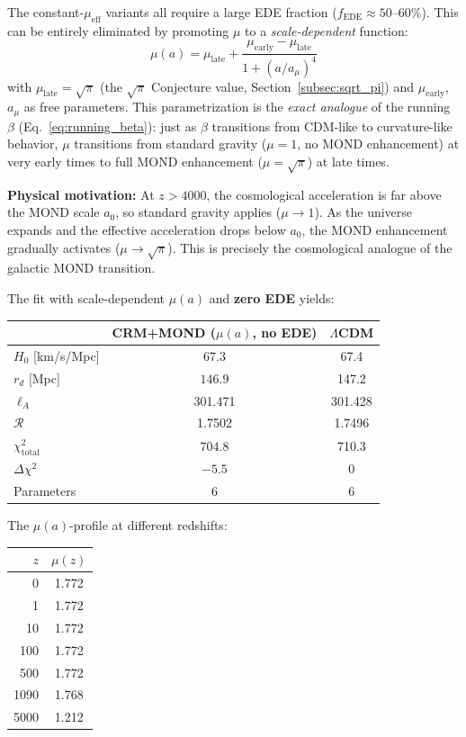 \documentclass[aps,prd,twocolumn,superscriptaddress,nofootinbib]{revtex4-2}
\begin{document}
The constant-$\mu_{\mathrm{eff}}$ variants all require a large EDE fraction ($f_{\mathrm{EDE}} \approx 50$--$60\%$). This can be entirely eliminated by promoting $\mu$ to a \textit{scale-dependent} function:
\begin{equation}
\mu(a) = \mu_{\mathrm{late}} + \frac{\mu_{\mathrm{early}} - \mu_{\mathrm{late}}}{1 + (a/a_\mu)^4}
\label{eq:mu_running}
\end{equation}
with $\mu_{\mathrm{late}} = \sqrt{\pi}$ (the $\sqrt{\pi}$ Conjecture value, Section~\ref{subsec:sqrt_pi}) and $\mu_{\mathrm{early}}$, $a_\mu$ as free parameters. This parametrization is the \textit{exact analogue} of the running $\beta$ (Eq.~\ref{eq:running_beta}): just as $\beta$ transitions from CDM-like to curvature-like behavior, $\mu$ transitions from standard gravity ($\mu = 1$, no MOND enhancement) at very early times to full MOND enhancement ($\mu = \sqrt{\pi}$) at late times.

\textbf{Physical motivation:} At $z > 4000$, the cosmological acceleration is far above the MOND scale $a_0$, so standard gravity applies ($\mu \to 1$). As the universe expands and the effective acceleration drops below $a_0$, the MOND enhancement gradually activates ($\mu \to \sqrt{\pi}$). This is precisely the cosmological analogue of the galactic MOND transition.

The fit with scale-dependent $\mu(a)$ and \textbf{zero EDE} yields:
\begin{center}
\begin{tabular}{lcc}
\toprule
& CRM+MOND ($\mu(a)$, no EDE) & $\Lambda$CDM \\
\midrule
$H_0$ [km/s/Mpc] & $\mathbf{67.3}$ & 67.4 \\
$r_d$ [Mpc] & $\mathbf{146.9}$ & 147.2 \\
$\ell_A$ & 301.471 & 301.428 \\
$\mathcal{R}$ & 1.7502 & 1.7496 \\
$\chi^2_{\mathrm{total}}$ & $\mathbf{704.8}$ & 710.3 \\
$\Delta\chi^2$ & $\mathbf{-5.5}$ & 0 \\
Parameters & 6 & 6 \\
\bottomrule
\end{tabular}
\end{center}

The $\mu(a)$-profile at different redshifts:
\begin{center}
\begin{tabular}{rc}
\toprule
$z$ & $\mu(z)$ \\
\midrule
0 & 1.772 \\
1 & 1.772 \\
10 & 1.772 \\
100 & 1.772 \\
500 & 1.772 \\
1090 & 1.768 \\
5000 & 1.212 \\
\bottomrule
\end{tabular}
\end{center}
\end{document}
